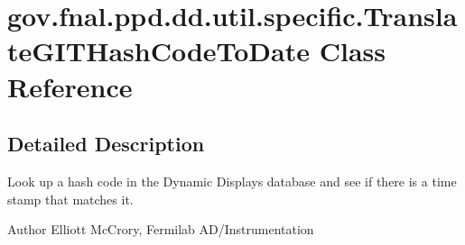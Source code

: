 \hypertarget{classgov_1_1fnal_1_1ppd_1_1dd_1_1util_1_1specific_1_1TranslateGITHashCodeToDate}{\section{gov.\-fnal.\-ppd.\-dd.\-util.\-specific.\-Translate\-G\-I\-T\-Hash\-Code\-To\-Date Class Reference}
\label{classgov_1_1fnal_1_1ppd_1_1dd_1_1util_1_1specific_1_1TranslateGITHashCodeToDate}
}


\subsection{Detailed Description}
Look up a hash code in the Dynamic Displays database and see if there is a time stamp that matches it.

\begin{DoxyAuthor}{Author}
Elliott Mc\-Crory, Fermilab A\-D/\-Instrumentation 
\end{DoxyAuthor}
